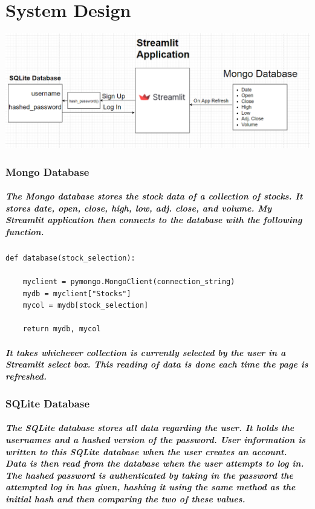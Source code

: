 \chapter{System Design}


\begin{center}    
    \includegraphics[scale=0.5]{img/architecture.png}
\end{center}

\subsection{Mongo Database}
\paragraph{The Mongo database stores the stock data of a collection of stocks. It stores date, open, close, high, low, adj. close, and volume. My Streamlit application then connects to the database with the following function.}

\begin{verbatim}
def database(stock_selection):

    myclient = pymongo.MongoClient(connection_string)
    mydb = myclient["Stocks"]
    mycol = mydb[stock_selection]

    return mydb, mycol
\end{verbatim}

\paragraph{It takes whichever collection is currently selected by the user in a Streamlit select box. This reading of data is done each time the page is refreshed.}

\subsection{SQLite Database}
\paragraph{The SQLite database stores all data regarding the user. It holds the usernames and a hashed version of the password. User information is written to this SQLite database when the user creates an account. Data is then read from the database when the user attempts to log in. The hashed password is authenticated by taking in the password the attempted log in has given, hashing it using the same method as the initial hash and then comparing the two of these values.}

